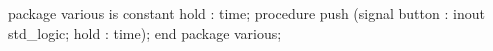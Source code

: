 package various is
    constant hold : time;
    procedure push (signal button : inout std_logic; hold : time);
end package various;